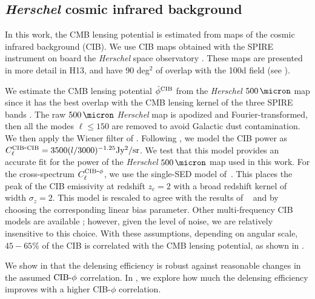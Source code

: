 \subsection{\textit{Herschel} cosmic infrared background}
\label{sec:cib}
In this work, the CMB lensing potential is estimated from maps of the cosmic infrared background (CIB).
We use CIB maps obtained with the SPIRE instrument \citep{Griffin:2010hp} on board the \textit{Herschel} space observatory \citep{Pilbratt:2010mv}.
These maps are presented in more detail in H13, and have 90 deg$^2$ of overlap with the 100d field (see ).

We estimate the CMB lensing potential $\hat{\phi}^{\rm CIB}$ from the \textit{Herschel} $500\,\micron$ map since it has the best overlap with the CMB lensing kernel of the three SPIRE bands \citep{Holder:2013hqu}.
The raw $500\,\micron$ \textit{Herschel} map is apodized and Fourier-transformed, then all the modes $\ell\!\le\!150$ are removed to avoid Galactic dust contamination.
We then apply the Wiener filter of .
Following \cite{Addison:2011se}, we model the CIB power as $C_{\ell}^{{\rm CIB}\mbox{-}{\rm CIB}} = 3500 (l/3000)^{-1.25} {\rm Jy^2 / sr}$.
We test that this model provides an accurate fit for the power of the \textit{Herschel} $500\,\micron$ map used in this work.
For the cross-spectrum $C_{\ell}^{{\rm CIB}\mbox{-}\phi}$, we use the single-SED model of~\cite{hall10}.
This places the peak of the CIB emissivity at redshift $z_c = 2$ with a broad redshift kernel of width $\sigma_z = 2$.
This model is rescaled to agree with the results of
~\citet{Holder:2013hqu} and \citet{planck2013XVIII} by choosing the corresponding linear bias parameter.
Other multi-frequency CIB models are available \citep[e.g.,][]{Bethermin:2013nza}; however, given the level of noise, we are relatively insensitive to this choice.
With these assumptions, depending on angular scale, $45-65\%$ of the CIB is correlated with the CMB lensing potential, as shown in .

We show in  that the delensing efficiency is robust against reasonable changes in the assumed ${\rm CIB}\mbox{-}\phi$ correlation.
In , we explore how much the delensing efficiency improves with a higher CIB-$\phi$ correlation.

